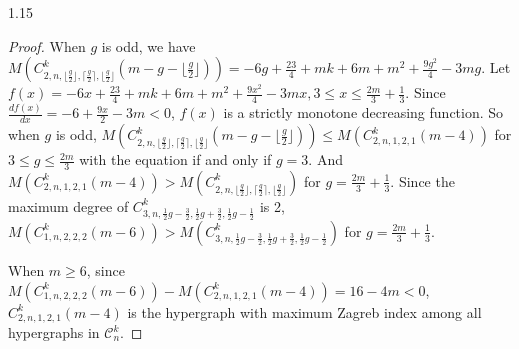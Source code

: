 \documentclass[preprint,12pt]{elsarticle1}
\numberwithin{equation}{section}
\begin{document}
\begin{spacing}{1.15}
\begin{proof}
When $g$ is odd, we have $M(C_{2,n,\lfloor\frac{g}{2}\rfloor,\lceil\frac{g}{2}\rceil,\lfloor\frac{g}{2}\rfloor}^{k}(m-g-\lfloor\frac{g}{2}\rfloor))=-6g+\frac{23}{4}+mk+6m+m^{2}+\frac{9g^{2}}{4}-3mg$.
Let $f(x)=-6x+\frac{23}{4}+mk+6m+m^{2}+\frac{9x^{2}}{4}-3mx, 3\leq x\leq \frac{2m}{3}+\frac{1}{3}.$ Since $\frac{df(x)}{dx}=-6+\frac{9x}{2}-3m<0$, $f(x)$ is a strictly monotone decreasing function. So
when $g$ is odd, $M(C_{2,n,\lfloor\frac{g}{2}\rfloor,\lceil\frac{g}{2}\rceil,\lfloor\frac{g}{2}\rfloor}^{k}(m-g-\lfloor\frac{g}{2}\rfloor))\leq M(C_{2,n,1,2,1}^{k}(m-4))$ for $3\leq g\leq \frac{2m}{3}$ with the equation if and only if $g=3$. And $M(C_{2,n,1,2,1}^{k}(m-4))>M(C_{2,n,\lfloor\frac{g}{2}\rfloor,\lceil\frac{g}{2}\rceil,\lfloor\frac{g}{2}\rfloor}^{k})$ for $g=\frac{2m}{3}+\frac{1}{3}.$
Since the maximum degree of $C_{3,n,\frac{1}{2}g-\frac{3}{2},\frac{1}{2}g+\frac{3}{2},\frac{1}{2}g-\frac{1}{2}}^{k}$ is 2, $M(C_{1,n,2,2,2}^{k}(m-6))> M(C_{3,n,\frac{1}{2}g-\frac{3}{2},\frac{1}{2}g+\frac{3}{2},\frac{1}{2}g-\frac{1}{2}}^{k})$ for $g=\frac{2m}{3}+\frac{1}{3}.$


When $m\geq6$,
since $M(C_{1,n,2,2,2}^{k}(m-6))-M(C_{2,n,1,2,1}^{k}(m-4))=16-4m<0$, $C_{2,n,1,2,1}^{k}(m-4)$ is the hypergraph with maximum Zagreb index among all hypergraphs in $\mathcal{C}_{n}^{k}$.
\end{proof}




\end{spacing}
\end{document}
